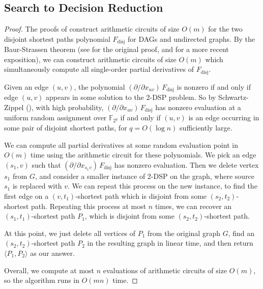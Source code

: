 \documentclass[11pt]{article}
\DeclareMathOperator{\disj}{disj}
\theoremstyle{definition}
\newtheorem{theorem}{Theorem}
\begin{document}
\subsection{Search to Decision Reduction}
\search*
\begin{proof}
    The proofs of  construct arithmetic circuits of size $O(m)$ for the two disjoint shortest paths polynomial $F_{\disj}$ for DAGs and undirected graphs.
    By the Baur-Strassen theorem (see \cite{BaurStrassen1983} for the original proof, and \cite[Theorem 2.5]{ShpilkaYehudayoff2009} for a more recent exposition), we can construct arithmetic circuits of size $O(m)$ which simultaneously compute all single-order partial derivatives of $F_{\disj}$.

    Given an edge $(u,v)$, the polynomial $(\partial /\partial x_{uv})\, F_{\disj}$ is nonzero if and only if  edge $(u,v)$ appears in some solution to the \textsf{2-DSP} problem.
    So by Schwartz-Zippel (), with high probability,  $(\partial /\partial x_{uv})\, F_{\disj}$ has nonzero evaluation at a uniform random assignment over $\mathbb{F}_{2^q}$ if and only if $(u,v)$ is an edge occurring in some pair of disjoint shortest paths, for $q = O(\log n)$ sufficiently large.

    We can compute all partial derivatives at some random evaluation point in $O(m)$ time using the arithmetic circuit for these polynomials.
    We pick an edge $(s_1, v)$ such that $(\partial /\partial x_{s_1v})\, F_{\disj}$ has nonzero evaluation.
    Then we delete vertex $s_1$ from $G$, and consider a smaller instance of \textsf{2-DSP} on the graph, where source $s_1$ is replaced with $v$.
    We can repeat this process on the new instance, to find the first edge on a $(v,t_1)$-shortest path which is disjoint from some $(s_2,t_2)$-shortest path.
    Repeating this process at most $n$ times, we can recover an $(s_1,t_1)$-shortest path $P_1$, which is disjoint from some $(s_2,t_2)$-shortest path.
    
    At this point, we just delete all vertices of $P_1$ from the original graph $G$, find an $(s_2,t_2)$-shortest path $P_2$ in the resulting graph in linear time, and then return $\langle P_1,P_2\rangle$ as our answer.

    Overall, we compute at most $n$ evaluations of arithmetic circuits of size $O(m)$, so the algorithm runs in $O(mn)$ time.
\end{proof}
\end{document}
